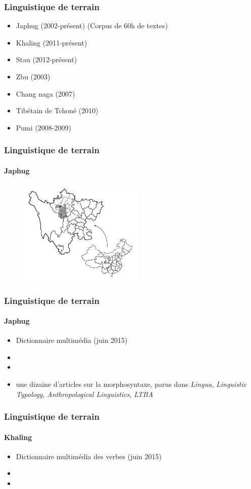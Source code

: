 \documentclass[xcolor=table]{beamer}
\begin{document}
   \begin{frame} 
 \frametitle{Linguistique de terrain} 
 \begin{itemize}%
\item Japhug (2002-présent) (Corpus de 60h de textes)
\item Khaling (2011-présent)
\item Stau (2012-présent)
\item Zbu (2003)
\item Chang naga (2007)
\item Tibétain de Tchoné (2010) 
\item Pumi (2008-2009)
\end{itemize}
   \end{frame} 
   
      \begin{frame} 
 \frametitle{Linguistique de terrain} 
  \framesubtitle{Japhug} 
    \begin{figure}[H]
\centering
\includegraphics[height=50mm]{carte.JPG}
\end{figure}   
       \end{frame} 
       
      \begin{frame} 
 \frametitle{Linguistique de terrain} 
  \framesubtitle{Japhug} 
 \begin{itemize}%
\item Dictionnaire multimédia (juin 2015)
\item {}
\item {}  
\item une dizaine d'articles sur la morphosyntaxe, parus dans \textit{Lingua}, \textit{Linguistic Typology}, \textit{Anthropological Linguistics}, \textit{LTBA}
\end{itemize}
    \end{frame} 
    
      \begin{frame} 
 \frametitle{Linguistique de terrain} 
  \framesubtitle{Khaling} 
  \begin{itemize}%
\item Dictionnaire multimédia des verbes (juin 2015)
\item {}  
\item {}
\end{itemize}
    \end{frame} 
    
\end{document}
